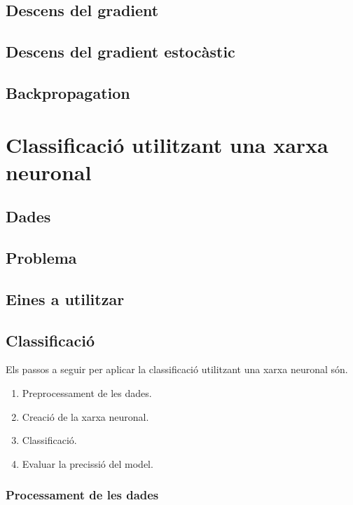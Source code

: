 \documentclass[12pt]{article}
\begin{document}
\clearpage
\subsection{Descens del gradient\label{dg}}


\clearpage
\subsection{Descens del gradient estocàstic\label{dge}}


\clearpage
\subsection{Backpropagation\label{bp}}


\clearpage
\section{Classificació utilitzant una xarxa neuronal}
\subsection{Dades}
\subsection{Problema}
\subsection{Eines a utilitzar}
\subsection{Classificació}
Els passos a seguir per aplicar la classificació utilitzant una xarxa neuronal són.
\begin{enumerate}
	\item Preprocessament de les dades.
	\item Creació de la xarxa neuronal.
	\item Classificació.
	\item Evaluar la precissió del model.
\end{enumerate}
\subsubsection{Processament de les dades}
\end{document}
